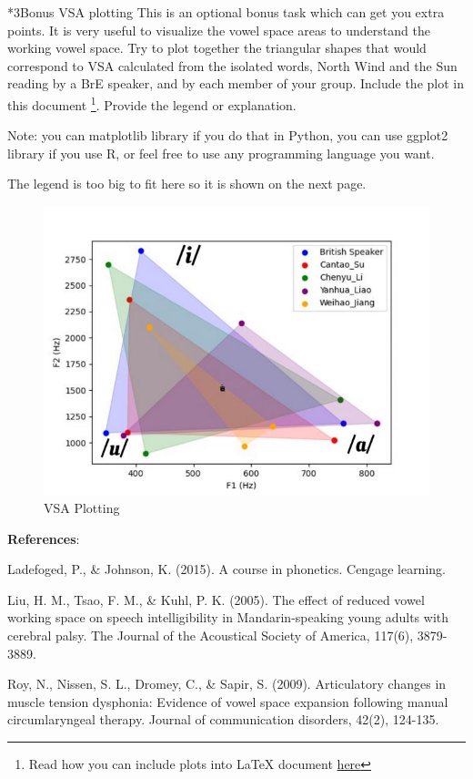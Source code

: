 \documentclass{../labbook}
\begin{document}
\begin{problem}{2}{*3}{Bonus VSA plotting}
This is an optional bonus task which can get you extra points. It is very useful to visualize the vowel space areas to understand the working vowel space. 
Try to plot together the triangular shapes that would correspond to VSA calculated from the isolated words, North Wind and the Sun reading by a BrE speaker, and by each member of your group. 
Include the plot in this document \footnote{Read how you can include plots into LaTeX document \href{https://www.overleaf.com/learn/latex/Inserting_Images}{here}}. Provide the legend or explanation.


Note: you can matplotlib library if you do that in Python, you can use ggplot2 library if you use R, or feel free to use any programming language you want.
\end{problem}

\begin{solution}
The legend is too big to fit here so it is shown on the next page.
\end{solution}

\begin{figure}[H]
\centering
\includegraphics{pic2.jpg}
\caption{VSA Plotting}
\end{figure}

\bigskip
\textbf{References}:

\noindent Ladefoged, P., \& Johnson, K. (2015). A course in phonetics. Cengage learning.

Liu, H. M., Tsao, F. M., \& Kuhl, P. K. (2005). The effect of reduced vowel working space on speech intelligibility in Mandarin-speaking young adults with cerebral palsy. The Journal of the Acoustical Society of America, 117(6), 3879-3889.

Roy, N., Nissen, S. L., Dromey, C., \& Sapir, S. (2009). Articulatory changes in muscle tension dysphonia: Evidence of vowel space expansion following manual circumlaryngeal therapy. Journal of communication disorders, 42(2), 124-135.
\end{document}

